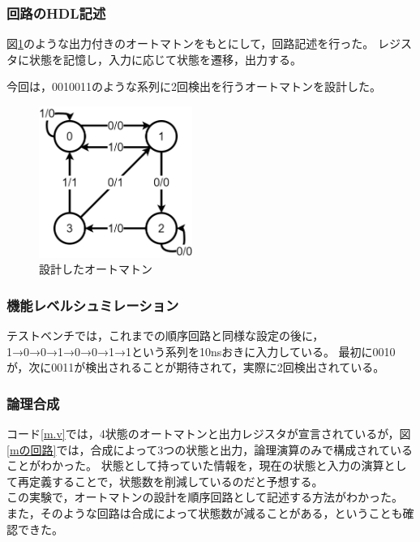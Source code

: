 \subsubsection{回路のHDL記述}
図\ref{設計したオートマトン}のような出力付きのオートマトンをもとにして，回路記述を行った。
レジスタに状態を記憶し，入力に応じて状態を遷移，出力する。

今回は，0010011のような系列に2回検出を行うオートマトンを設計した。

\begin{figure}[H]
  \centering
  \includegraphics[width=5cm]{./src/m/mautomaton.png}
  \caption{設計したオートマトン}
  \label{設計したオートマトン}
\end{figure}

\subsubsection{機能レベルシュミレーション}
テストベンチでは，これまでの順序回路と同様な設定の後に，1→0→0→1→0→0→1→1という系列を10nsおきに入力している。
最初に0010が，次に0011が検出されることが期待されて，実際に2回検出されている。

\subsubsection{論理合成}
コード\ref{m.v}では，4状態のオートマトンと出力レジスタが宣言されているが，図\ref{mの回路}では，合成によって3つの状態と出力，論理演算のみで構成されていることがわかった。
状態として持っていた情報を，現在の状態と入力の演算として再定義することで，状態数を削減しているのだと予想する。\\

この実験で，オートマトンの設計を順序回路として記述する方法がわかった。
また，そのような回路は合成によって状態数が減ることがある，ということも確認できた。
